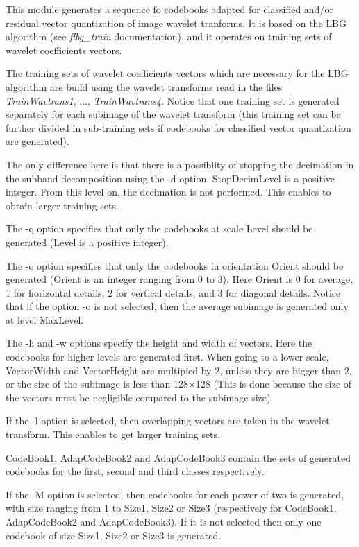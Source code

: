 This module generates a sequence fo codebooks adapted 
for classified and/or residual vector quantization
of image wavelet tranforms. 
It is based on the LBG algorithm (see {\em flbg\_train} documentation), 
and it operates on training sets of wavelet coefficients vectors. 

The training sets of wavelet coefficients vectors which are necessary 
for the LBG algorithm are build using the wavelet transforms 
read in the files {\em TrainWavtrans1}, ..., {\em TrainWavtrans4}. 
Notice that one training set is generated separately for each subimage 
of the wavelet transform (this training set can be further divided 
in sub-training sets if codebooks for classified vector quantization 
are generated). 

The only difference here is that there is a possiblity 
of stopping the decimation in the subband decomposition using the -d 
option. StopDecimLevel is a positive integer. From this level on, 
the decimation is not performed. This enables to obtain larger 
training sets. 

The -q option specifies that only the codebooks at scale Level 
should be generated (Level is a positive integer). 

The -o option specifies that only the codebooks in orientation 
Orient should be generated (Orient is an integer ranging from 0 to 3). 
Here Orient is 0 for average, 1 for horizontal details, 2 for vertical 
details, and 3 for diagonal details. Notice that if the option -o 
is not selected, then the average subimage is generated only at level 
MaxLevel. 

The -h and -w options specify the height and width of vectors. 
Here the codebooks for higher levels are generated first. 
When going to a lower scale, VectorWidth and VectorHeight are multipied 
by 2, unless they are bigger than 2, or the size of the subimage 
is less than 128$\times$128 (This is done because the size of the 
vectors must be negligible compared to the subimage size). 

If the -l option is selected, then overlapping vectors are taken in the 
wavelet transform. This enables to get larger training sets. 

CodeBook1, AdapCodeBook2 and AdapCodeBook3 contain the sets of generated 
codebooks for the first, second and third classes respectively. 

If the -M option is selected, then codebooks for each power of two is 
generated, with size ranging from 1 to Size1, Size2 or Size3 
(respectively for CodeBook1, AdapCodeBook2 and AdapCodeBook3). 
If it is not selected then only one codebook of size Size1, Size2 or Size3 
is generated. 

